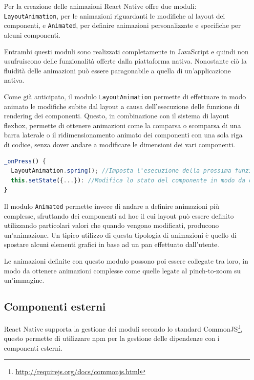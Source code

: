 Per la creazione delle animazioni React Native offre due moduli: \texttt{LayoutAnimation}, per le animazioni riguardanti le modifiche al layout dei componenti, e \texttt{Animated}, per definire animazioni personalizzate e specifiche per alcuni componenti.

Entrambi questi moduli sono realizzati completamente in JavaScript e quindi non usufruiscono delle funzionalità offerte dalla piattaforma nativa. 
Nonostante ciò la fluidità delle animazioni può essere paragonabile a quella di un'applicazione nativa.

Come già anticipato, il modulo \texttt{LayoutAnimation} permette di effettuare in modo animato le modifiche subite dal layout a causa dell'esecuzione delle funzione di rendering dei componenti.
Questo, in combinazione con il sistema di layout flexbox, permette di ottenere animazioni come la comparsa o scomparsa di una barra laterale o il ridimensionamento animato dei componenti con una sola riga di codice, senza dover andare a modificare le dimensioni dei vari componenti.

\begin{lstlisting}[language=JavaScript, caption=Utilizzo di LayoutAnimation]
_onPress() {
  LayoutAnimation.spring(); //Imposta l'esecuzione della prossima funzione di rendering in modo animato
  this.setState({...}): //Modifica lo stato del componente in modo da causarne il re-rendering
}
\end{lstlisting}

Il modulo \texttt{Animated} permette invece di andare a definire animazioni più complesse, sfruttando dei componenti ad hoc il cui layout può essere definito utilizzando particolari valori che quando vengono modificati, producono un'animazione.
Un tipico utilizzo di questa tipologia di animazioni è quello di spostare alcuni elementi grafici in base ad un \gls{pan} effettuato dall'utente.

Le animazioni definite con questo modulo possono poi essere collegate tra loro, in modo da ottenere animazioni complesse come quelle legate al \gls{pinch-to-zoom} su un'immagine.

\subsection{Componenti esterni}

React Native supporta la gestione dei moduli secondo lo standard CommonJS\footnote{\url{http://requirejs.org/docs/commonjs.html}}, questo permette di utilizzare npm per la gestione delle dipendenze con i componenti esterni.

